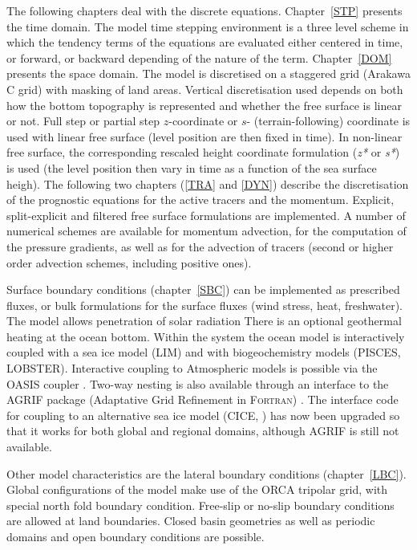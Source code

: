 \documentclass[NEMO_book]{subfiles}
\begin{document}
The following chapters deal with the discrete equations. Chapter~\ref{STP} presents the 
time domain. The model time stepping environment is a three level scheme in which 
the tendency terms of the equations are evaluated either centered  in time, or forward, 
or backward depending of the nature of the term.
Chapter~\ref{DOM} presents the space domain. The model is discretised on a staggered 
grid (Arakawa C grid) with masking of land areas. Vertical discretisation used depends 
on both how the bottom topography is represented and whether the free surface is linear or not. 
Full step or partial step $z$-coordinate or $s$- (terrain-following) coordinate is used 
with linear free surface (level position are then fixed in time). In non-linear free surface, 
the corresponding rescaled height coordinate formulation (\textit{z*} or \textit{s*}) is used 
(the level position then vary in time as a function of the sea surface heigh). 
The following two chapters (\ref{TRA} and \ref{DYN}) describe the discretisation of the 
prognostic equations for the active tracers and the momentum. Explicit, split-explicit 
and filtered free surface formulations are implemented. 
A number of numerical schemes are available for momentum advection, for the computation 
of the pressure gradients, as well as for the advection of tracers (second or higher 
order advection schemes, including positive ones).

Surface boundary conditions (chapter~\ref{SBC}) can be implemented as prescribed
fluxes, or bulk formulations for the surface fluxes (wind stress, heat, freshwater). The 
model allows penetration of solar radiation  There is an optional geothermal heating at 
the ocean bottom. Within the \NEMO system the ocean model is interactively coupled 
with a sea ice model (LIM) and with biogeochemistry models (PISCES, LOBSTER). 
Interactive coupling to Atmospheric models is possible via the OASIS coupler 
\citep{OASIS2006}. Two-way nesting is also available through an interface to the
AGRIF package (Adaptative Grid Refinement in \textsc{Fortran}) \citep{Debreu_al_CG2008}.
The interface code for coupling to an alternative sea ice model (CICE, \citet{Hunke2008})
has now been upgraded so that it works for both global and regional domains, although AGRIF 
is still not available.

Other model characteristics are the lateral boundary conditions (chapter~\ref{LBC}).  
Global configurations of the model make use of the ORCA tripolar grid, with special north 
fold boundary condition. Free-slip or no-slip boundary conditions are allowed at land 
boundaries. Closed basin geometries as well as periodic domains and open boundary 
conditions are possible. 
\end{document}
